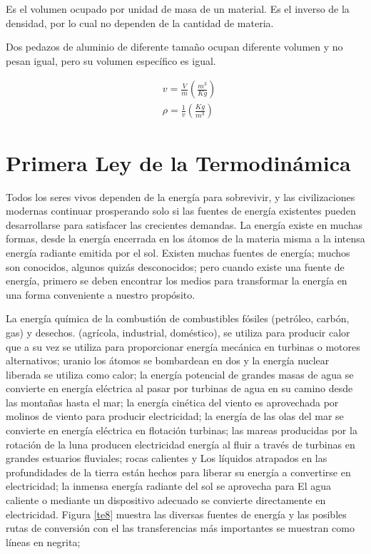 \begin{definition}
    Es el volumen ocupado por unidad de masa de un material. Es el inverso de la densidad, por lo cual no dependen de la cantidad de materia.
\end{definition}

Dos pedazos de aluminio de diferente tamaño ocupan diferente volumen y no pesan igual, pero su volumen específico es igual.

\begin{align}
    &v=\frac{V}{m}\left(\frac{m^3}{Kg}\right)\\ 
    &\rho=\frac{1}{v}\left(\frac{Kg}{m^3}\right)
\end{align}

\section{Primera Ley de la Termodinámica}

Todos los seres vivos dependen de la energía para sobrevivir, y las civilizaciones modernas
continuar prosperando solo si las fuentes de energía existentes pueden desarrollarse para satisfacer
las crecientes demandas. La energía existe en muchas formas, desde la energía encerrada en
los átomos de la materia misma a la intensa energía radiante emitida por el sol.
Existen muchas fuentes de energía; muchos son conocidos, algunos quizás desconocidos; pero
cuando existe una fuente de energía, primero se deben encontrar los medios para transformar la energía
en una forma conveniente a nuestro propósito.

La energía química de la combustión de combustibles fósiles (petróleo, carbón, gas) y desechos.
(agrícola, industrial, doméstico), se utiliza para producir calor que a su vez se utiliza
para proporcionar energía mecánica en turbinas o motores alternativos; uranio
los átomos se bombardean en dos y la energía nuclear liberada se utiliza como calor;
la energía potencial de grandes masas de agua se convierte en energía eléctrica
al pasar por turbinas de agua en su camino desde las montañas hasta el mar;
la energía cinética del viento es aprovechada por molinos de viento para producir electricidad;
la energía de las olas del mar se convierte en energía eléctrica en flotación
turbinas; las mareas producidas por la rotación de la luna producen electricidad
energía al fluir a través de turbinas en grandes estuarios fluviales; rocas calientes y
Los líquidos atrapados en las profundidades de la tierra están hechos para liberar su energía a
convertirse en electricidad; la inmensa energía radiante del sol se aprovecha para
El agua caliente o mediante un dispositivo adecuado se convierte directamente en electricidad. Figura \ref{te8}
muestra las diversas fuentes de energía y las posibles rutas de conversión con el
las transferencias más importantes se muestran como líneas en negrita; 


